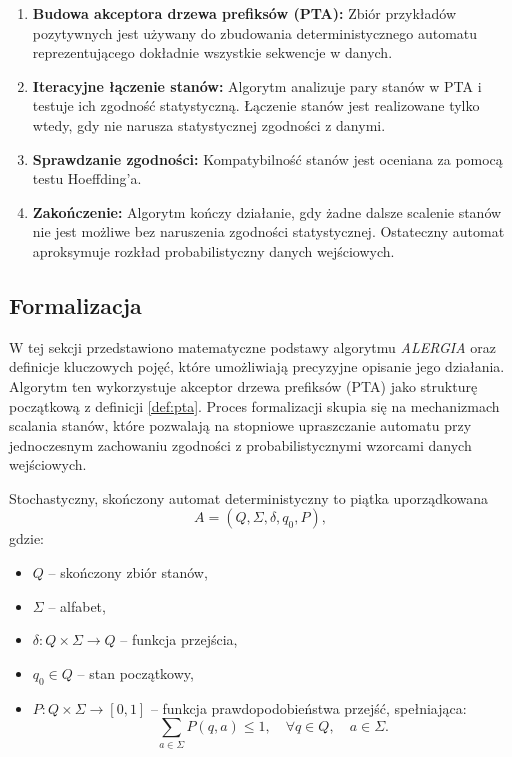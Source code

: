 \begin{enumerate}  
    \item \textbf{Budowa akceptora drzewa prefiksów (PTA):}  
        Zbiór przykładów pozytywnych jest używany do zbudowania deterministycznego automatu reprezentującego dokładnie wszystkie sekwencje w danych.  
    \item \textbf{Iteracyjne łączenie stanów:}  
        Algorytm analizuje pary stanów w PTA i testuje ich zgodność statystyczną. Łączenie stanów jest realizowane tylko wtedy, gdy nie narusza statystycznej zgodności z danymi.  
    \item \textbf{Sprawdzanie zgodności:}  
        Kompatybilność stanów jest oceniana za pomocą testu Hoeffding'a.  
    \item \textbf{Zakończenie:}  
        Algorytm kończy działanie, gdy żadne dalsze scalenie stanów nie jest możliwe bez naruszenia zgodności statystycznej. Ostateczny automat aproksymuje rozkład probabilistyczny danych wejściowych.  
\end{enumerate}


\subsection{Formalizacja}  
W tej sekcji przedstawiono matematyczne podstawy algorytmu \textit{ALERGIA} oraz definicje kluczowych pojęć, które umożliwiają precyzyjne opisanie jego działania. Algorytm ten wykorzystuje akceptor drzewa prefiksów (PTA) jako strukturę początkową z definicji \ref{def:pta}. Proces formalizacji skupia się na mechanizmach scalania stanów, które pozwalają na stopniowe upraszczanie automatu przy jednoczesnym zachowaniu zgodności z probabilistycznymi wzorcami danych wejściowych.  

\begin{definition}[DSFA]  
\label{def:dsfa}
Stochastyczny, skończony automat deterministyczny to piątka uporządkowana
\[ 
A = (Q, \Sigma, \delta, q_0, P), 
\]
gdzie:  
\begin{itemize}  
    \item \( Q \) – skończony zbiór stanów,  
    \item \( \Sigma \) – alfabet,  
    \item \( \delta : Q \times \Sigma \to Q \) – funkcja przejścia,  
    \item \( q_0 \in Q \) – stan początkowy,  
    \item \( P: Q \times \Sigma \to [0, 1] \) – funkcja prawdopodobieństwa przejść, spełniająca:  
    \[
    \sum_{a \in \Sigma} P(q, a) \leq 1, \quad \forall q \in Q, \quad a \in \Sigma.
    \]  
\end{itemize}
\end{definition}

